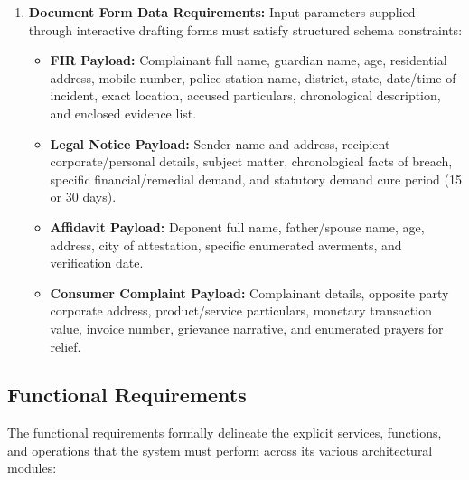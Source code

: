 \begin{enumerate}
    \item \textbf{Document Form Data Requirements:}
    Input parameters supplied through interactive drafting forms must satisfy structured schema constraints:
    \begin{itemize}
        \item \textbf{FIR Payload:} Complainant full name, guardian name, age, residential address, mobile number, police station name, district, state, date/time of incident, exact location, accused particulars, chronological description, and enclosed evidence list.
        \item \textbf{Legal Notice Payload:} Sender name and address, recipient corporate/personal details, subject matter, chronological facts of breach, specific financial/remedial demand, and statutory demand cure period (15 or 30 days).
        \item \textbf{Affidavit Payload:} Deponent full name, father/spouse name, age, address, city of attestation, specific enumerated averments, and verification date.
        \item \textbf{Consumer Complaint Payload:} Complainant details, opposite party corporate address, product/service particulars, monetary transaction value, invoice number, grievance narrative, and enumerated prayers for relief.
    \end{itemize}
\end{enumerate}

\subsection{Functional Requirements}
\label{subsec:functional_requirements}

The functional requirements formally delineate the explicit services, functions, and operations that the system must perform across its various architectural modules:

